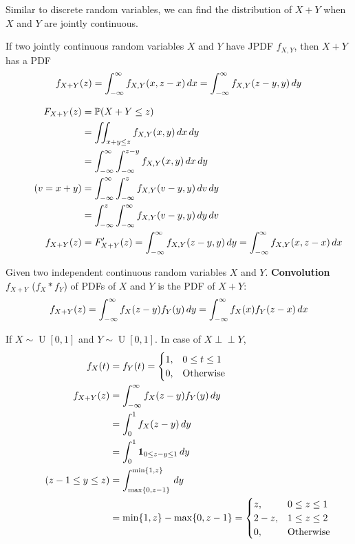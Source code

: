 \documentclass{huhtakm-template-book}
\newcommand{\independent}{\perp\!\!\!\perp}
\newcommand{\prob}{\mathbb{P}}
\DeclareMathOperator{\U}{U}
\begin{document}
    Similar to discrete random variables, we can find the distribution of $X+Y$ when $X$ and $Y$ are jointly continuous.
    \begin{thm}
        If two jointly continuous random variables $X$ and $Y$ have JPDF $f_{X,Y}$, then $X+Y$ has a PDF
        \begin{equation*}
            f_{X+Y}(z)=\int_{-\infty}^{\infty} f_{X,Y}(x,z-x)\,dx=\int_{-\infty}^{\infty} f_{X,Y}(z-y,y)\,dy
        \end{equation*}
    \end{thm}
    
    \newpage
    \begin{proofing}
        \begin{align*}
            F_{X+Y}(z)&=\prob(X+Y\leq z)\\
            &=\iint_{x+y\leq z}f_{X,Y}(x,y)\,dx\,dy\\
            &=\intinfty\intlu{-\infty}{z-y}f_{X,Y}(x,y)\,dx\,dy\\
            \tag{$v=x+y$}
            &=\intinfty\intlu{-\infty}{z}f_{X,Y}(v-y,y)\,dv\,dy\\
            &=\intlu{-\infty}{z}\intinfty f_{X,Y}(v-y,y)\,dy\,dv\\
            f_{X+Y}(z)&=F_{X+Y}'(z)=\intinfty f_{X,Y}(z-y,y)\,dy=\intinfty f_{X,Y}(x,z-x)\,dx
        \end{align*}
    \end{proofing}
    \begin{defn}
        Given two independent continuous random variables $X$ and $Y$. \textbf{Convolution} $f_{X+Y}$ ($f_{X}*f_{Y}$) of PDFs of $X$ and $Y$ is the PDF of $X+Y$:
        \begin{equation*}
            f_{X+Y}(z)=\int_{-\infty}^{\infty} f_{X}(z-y)f_{Y}(y)\,dy=\int_{-\infty}^{\infty} f_{X}(x)f_{Y}(z-x)\,dx
        \end{equation*}
    \end{defn}
    \begin{eg}
        If $X\sim\U[0,1]$ and $Y\sim\U[0,1]$. In case of $X\independent Y$,
        \begin{align*}
            f_{X}(t)&=f_{Y}(t)=\begin{cases}
                1, &0\leq t\leq 1\\
                0, &\text{Otherwise}
            \end{cases}\\
            f_{X+Y}(z)&=\int_{-\infty}^{\infty} f_{X}(z-y)f_{Y}(y)\,dy\\
            &=\int_{0}^{1}f_{X}(z-y)\,dy\\
            &=\int_{0}^{1}\mathbf{1}_{0\leq z-y\leq 1}\,dy\\
            \tag{$z-1\leq y\leq z$}
            &=\int_{\max\{0,z-1\}}^{\min\{1,z\}}\,dy\\
            &=\min\{1,z\}-\max\{0,z-1\}=\begin{cases}
                z, &0\leq z\leq 1\\
                2-z, &1\leq z\leq 2\\
                0, &\text{Otherwise}
            \end{cases}
        \end{align*}
    \end{eg}
\end{document}

